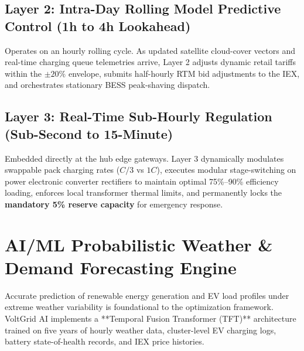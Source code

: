 \documentclass[10.5pt,a4paper]{article}
\begin{document}
\subsection{Layer 2: Intra-Day Rolling Model Predictive Control (1h to 4h Lookahead)}
Operates on an hourly rolling cycle. As updated satellite cloud-cover vectors and real-time charging queue telemetries arrive, Layer 2 adjusts dynamic retail tariffs within the $\pm 20\%$ envelope, submits half-hourly RTM bid adjustments to the IEX, and orchestrates stationary BESS peak-shaving dispatch.

\subsection{Layer 3: Real-Time Sub-Hourly Regulation (Sub-Second to 15-Minute)}
Embedded directly at the hub edge gateways. Layer 3 dynamically modulates swappable pack charging rates ($C/3$ vs $1C$), executes modular stage-switching on power electronic converter rectifiers to maintain optimal 75\%--90\% efficiency loading, enforces local transformer thermal limits, and permanently locks the \textbf{mandatory 5\% reserve capacity} for emergency response.

\section{AI/ML Probabilistic Weather \& Demand Forecasting Engine}

Accurate prediction of renewable energy generation and EV load profiles under extreme weather variability is foundational to the optimization framework. VoltGrid AI implements a **Temporal Fusion Transformer (TFT)** architecture trained on five years of hourly weather data, cluster-level EV charging logs, battery state-of-health records, and IEX price histories.
\end{document}
